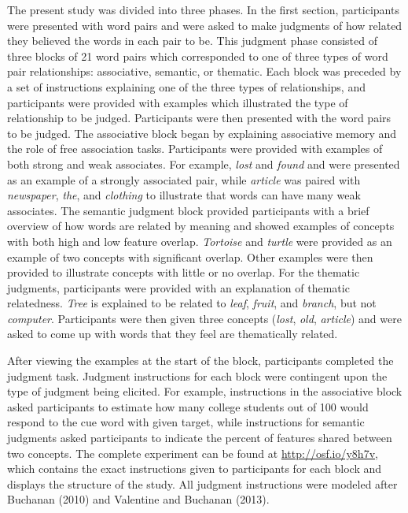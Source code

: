 \documentclass[english,man]{apa6}
\theoremstyle{definition}
\theoremstyle{definition}
\theoremstyle{definition}
\theoremstyle{remark}
\begin{document}
The present study was divided into three phases. In the first section,
participants were presented with word pairs and were asked to make
judgments of how related they believed the words in each pair to be.
This judgment phase consisted of three blocks of 21 word pairs which
corresponded to one of three types of word pair relationships:
associative, semantic, or thematic. Each block was preceded by a set of
instructions explaining one of the three types of relationships, and
participants were provided with examples which illustrated the type of
relationship to be judged. Participants were then presented with the
word pairs to be judged. The associative block began by explaining
associative memory and the role of free association tasks. Participants
were provided with examples of both strong and weak associates. For
example, \emph{lost} and \emph{found} and were presented as an example
of a strongly associated pair, while \emph{article} was paired with
\emph{newspaper}, \emph{the}, and \emph{clothing} to illustrate that
words can have many weak associates. The semantic judgment block
provided participants with a brief overview of how words are related by
meaning and showed examples of concepts with both high and low feature
overlap. \emph{Tortoise} and \emph{turtle} were provided as an example
of two concepts with significant overlap. Other examples were then
provided to illustrate concepts with little or no overlap. For the
thematic judgments, participants were provided with an explanation of
thematic relatedness. \emph{Tree} is explained to be related to
\emph{leaf}, \emph{fruit}, and \emph{branch}, but not \emph{computer}.
Participants were then given three concepts (\emph{lost}, \emph{old},
\emph{article}) and were asked to come up with words that they feel are
thematically related.

After viewing the examples at the start of the block, participants
completed the judgment task. Judgment instructions for each block were
contingent upon the type of judgment being elicited. For example,
instructions in the associative block asked participants to estimate how
many college students out of 100 would respond to the cue word with
given target, while instructions for semantic judgments asked
participants to indicate the percent of features shared between two
concepts. The complete experiment can be found at
\url{http://osf.io/y8h7v}, which contains the exact instructions given
to participants for each block and displays the structure of the study.
All judgment instructions were modeled after Buchanan (2010) and
Valentine and Buchanan (2013).
\end{document}
